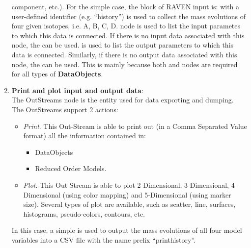 \begin{enumerate}
     component, etc.).
     For the simple case, the  block of RAVEN input is:
      with a user-defined identifier (e.g. ``history'') is used to collect the mass evolutions
     of four given isotopes, i.e. A, B, C, D.  node is used to list the input parametes to which
     this data is connected. If there is no input data associated with this node, the 
     can be used.  is used to list the output parameters to which this data is connected. Similarly,
     if there is no output data associated with this node, the  can be used. This is
     mainly because both  and  nodes are required for all types of \textbf{DataObjects}.

    \item \textbf{Print and plot input and output data}: 
      \\ The OutStreams node is the entity used for data exporting and dumping. The OutStreams support
      2 actions:
      \begin{itemize}
       \item \textit{Print}. This Out-Stream is able to print out (in a Comma Separated Value format) all the information
         contained in:
         \begin{itemize}
          \item DataObjects
          \item Reduced Order Models.
         \end{itemize}
       \item \textit{Plot}. This Out-Stream is able to plot 2-Dimensional, 3-Dimensional, 4-Dimensional (using color
       mapping) and 5-Dimensional (using marker size). Several types of plot are available, such as scatter, line, surfaces,
       histograms, pseudo-colors, contours, etc.
      \end{itemize}
      In this case, a simple  is used to output the mass evolutions of all four model variables
      into a CSV file with the name prefix ``print\textunderscore history''.


\end{enumerate}
